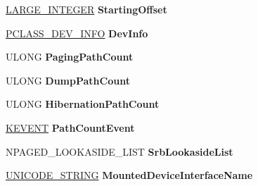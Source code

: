 \begin{DoxyCompactItemize}
\hyperlink{union___l_a_r_g_e___i_n_t_e_g_e_r}{L\+A\+R\+G\+E\+\_\+\+I\+N\+T\+E\+G\+ER} {\bfseries Starting\+Offset}
\item 
\mbox{\label{struct___c_o_m_m_o_n___d_e_v_i_c_e___e_x_t_e_n_s_i_o_n_ad0ae3afe69f672a6a9bf6ef05b1321cd}} 
\hyperlink{struct___c_l_a_s_s___d_e_v___i_n_f_o}{P\+C\+L\+A\+S\+S\+\_\+\+D\+E\+V\+\_\+\+I\+N\+FO} {\bfseries Dev\+Info}
\item 
\mbox{\label{struct___c_o_m_m_o_n___d_e_v_i_c_e___e_x_t_e_n_s_i_o_n_ae865baf78cd2af544acdd4be700af1dd}} 
U\+L\+O\+NG {\bfseries Paging\+Path\+Count}
\item 
\mbox{\label{struct___c_o_m_m_o_n___d_e_v_i_c_e___e_x_t_e_n_s_i_o_n_a3c12ca157e3b910655931e61255d5e71}} 
U\+L\+O\+NG {\bfseries Dump\+Path\+Count}
\item 
\mbox{\label{struct___c_o_m_m_o_n___d_e_v_i_c_e___e_x_t_e_n_s_i_o_n_a84f813147e7131fcf613344e990821a3}} 
U\+L\+O\+NG {\bfseries Hibernation\+Path\+Count}
\item 
\mbox{\label{struct___c_o_m_m_o_n___d_e_v_i_c_e___e_x_t_e_n_s_i_o_n_a06cf5f7f5fcbc83ce7ea2dd1c8779165}} 
\hyperlink{struct___k_e_v_e_n_t}{K\+E\+V\+E\+NT} {\bfseries Path\+Count\+Event}
\item 
\mbox{\label{struct___c_o_m_m_o_n___d_e_v_i_c_e___e_x_t_e_n_s_i_o_n_a3fd4dcd6831901a94a5deb27b12b6757}} 
N\+P\+A\+G\+E\+D\+\_\+\+L\+O\+O\+K\+A\+S\+I\+D\+E\+\_\+\+L\+I\+ST {\bfseries Srb\+Lookaside\+List}
\item 
\mbox{\label{struct___c_o_m_m_o_n___d_e_v_i_c_e___e_x_t_e_n_s_i_o_n_acf12a04c8780f262e17a9c2acac7fcb5}} 
\hyperlink{struct___u_n_i_c_o_d_e___s_t_r_i_n_g}{U\+N\+I\+C\+O\+D\+E\+\_\+\+S\+T\+R\+I\+NG} {\bfseries Mounted\+Device\+Interface\+Name}
\item 
\mbox{\label{struct___c_o_m_m_o_n___d_e_v_i_c_e___e_x_t_e_n_s_i_o_n_ad8ccad6e3f8f5f309b57d1b166f255dc}} 

\end{DoxyCompactItemize}
